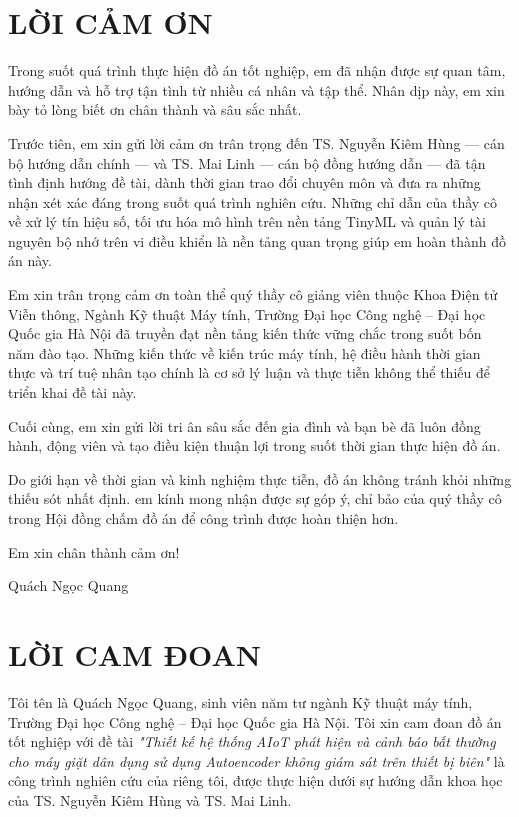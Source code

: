\chapter*{LỜI CẢM ƠN}
\fontsize{13}{15}\selectfont
Trong suốt quá trình thực hiện đồ án tốt nghiệp, em đã nhận được sự quan tâm, hướng dẫn và hỗ trợ tận tình từ nhiều cá nhân và tập thể. Nhân dịp này, em xin bày tỏ lòng biết ơn chân thành và sâu sắc nhất.

Trước tiên, em xin gửi lời cảm ơn trân trọng đến TS. Nguyễn Kiêm Hùng — cán bộ hướng dẫn chính — và TS. Mai Linh — cán bộ đồng hướng dẫn — đã tận tình định hướng đề tài, dành thời gian trao đổi chuyên môn và đưa ra những nhận xét xác đáng trong suốt quá trình nghiên cứu. Những chỉ dẫn của thầy cô về xử lý tín hiệu số, tối ưu hóa mô hình trên nền tảng TinyML và quản lý tài nguyên bộ nhớ trên vi điều khiển là nền tảng quan trọng giúp em hoàn thành đồ án này.

Em xin trân trọng cảm ơn toàn thể quý thầy cô giảng viên thuộc Khoa Điện tử Viễn thông, Ngành Kỹ thuật Máy tính, Trường Đại học Công nghệ – Đại học Quốc gia Hà Nội đã truyền đạt nền tảng kiến thức vững chắc trong suốt bốn năm đào tạo. Những kiến thức về kiến trúc máy tính, hệ điều hành thời gian thực và trí tuệ nhân tạo chính là cơ sở lý luận và thực tiễn không thể thiếu để triển khai đề tài này.

Cuối cùng, em xin gửi lời tri ân sâu sắc đến gia đình và bạn bè đã luôn đồng hành, động viên và tạo điều kiện thuận lợi trong suốt thời gian thực hiện đồ án.

Do giới hạn về thời gian và kinh nghiệm thực tiễn, đồ án không tránh khỏi những thiếu sót nhất định. em kính mong nhận được sự góp ý, chỉ bảo của quý thầy cô trong Hội đồng chấm đồ án để công trình được hoàn thiện hơn.

Em xin chân thành cảm ơn!

\vspace{0.5cm}
\begin{flushright}
    Quách Ngọc Quang\hspace*{1.3cm}
\end{flushright}

\chapter*{LỜI CAM ĐOAN}
\fontsize{13}{15}\selectfont
Tôi tên là Quách Ngọc Quang, sinh viên năm tư ngành Kỹ thuật máy tính, Trường Đại học Công nghệ – Đại học Quốc gia Hà Nội. Tôi xin cam đoan đồ án tốt nghiệp với đề tài \textit{"Thiết kế hệ thống AIoT phát hiện và cảnh báo bất thường cho máy giặt dân dụng sử dụng Autoencoder không giám sát trên thiết bị biên"} là công trình nghiên cứu của riêng tôi, được thực hiện dưới sự hướng dẫn khoa học của TS. Nguyễn Kiêm Hùng và TS. Mai Linh.

